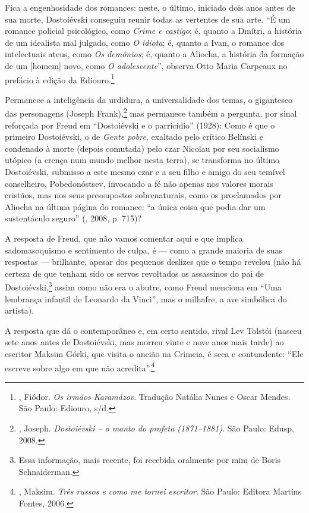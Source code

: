 Fica a engenhosidade dos romances: neste, o último, iniciado dois anos antes de sua morte, Dostoiévski conseguiu reunir todas as vertentes de sua arte. ``É um romance policial psicológico, como \emph{Crime e castigo}; é, quanto a Dmítri, a história de um idealista mal julgado, como \emph{O idiota}; é, quanto a Ivan, o romance dos intelectuais ateus, como \emph{Os demônios}; é, quanto a Aliocha, a história da formação de um [homem] novo, como \emph{O adolescente}'', observa Otto Maria Carpeaux no prefácio à edição da Ediouro.\footnote{, Fiódor. \emph{Os irmãos Karamázov}. Tradução Natália Nunes e Oscar Mendes. São Paulo: Ediouro, s/d.}

Permanece a inteligência da urdidura, a universalidade dos temas, o gigantesco das personagens (Joseph Frank),\footnote{, Joseph. \emph{Dostoiévski -- o manto do profeta (1871--1881)}. São Paulo: Edusp, 2008.} mas permanece também a pergunta, por sinal reforçada por Freud em ``Dostoiévski e o parricídio'' (1928): Como é que o primeiro Dostoiévski, o de \emph{Gente pobre}, exaltado pelo crítico Belínski e condenado à morte (depois comutada) pelo czar Nicolau  por seu socialismo utópico (a crença num mundo melhor nesta terra), se transforma no último Dostoiévski, submisso a este mesmo czar e a seu filho e amigo do seu temível conselheiro, Pobedonóstsev, invocando a fé não apenas nos valores morais cristãos, mas nos seus pressupostos sobrenaturais, como os proclamados por Aliocha na última página do romance: ``a única coisa que podia dar um sustentáculo seguro'' (, 2008, p. 715)?

A resposta de Freud, que não vamos comentar aqui e que implica sadomasoquismo e sentimento de culpa, é --- como a grande maioria de suas respostas --- brilhante, apesar dos pequenos deslizes que o tempo revelou (não há certeza de que tenham sido os servos revoltados os assassinos do pai de Dostoiévski,\footnote{Essa informação, mais recente, foi recebida oralmente por mim de Boris Schnaiderman.} assim como não era o abutre, como Freud menciona em ``Uma lembrança infantil de Leonardo da Vinci'', mas o milhafre, a ave simbólica do artista).

A resposta que dá o contemporâneo e, em certo sentido, rival Lev Tolstói (nasceu sete anos antes de Dostoiévski, mas morreu vinte e nove anos mais tarde) ao escritor Maksim Górki, que visita o ancião na Crimeia, é seca e contundente: ``Ele escreve sobre algo em que não acredita''.\footnote{, Maksim. \emph{Três russos e como me tornei escritor}. São Paulo: Editora Martins Fontes, 2006.}

